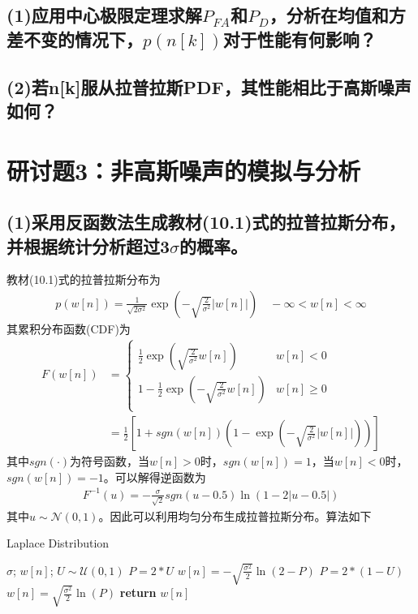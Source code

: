 \documentclass[fontset=windows]{article}
\numberwithin{figure}{section}
\begin{document}
\subsection*{(1)应用中心极限定理求解\(P_{FA}\)和\(P_D\)，分析在均值和方差不变的情况下，\(p(n[k])\)对于性能有何影响？}


\subsection*{(2)若n[k]服从拉普拉斯PDF，其性能相比于高斯噪声如何？}

\newpage
\section{研讨题3：非高斯噪声的模拟与分析}

\subsection*{(1)采用反函数法生成教材(10.1)式的拉普拉斯分布，并根据统计分析超过3\(\sigma\)的概率。}

教材(10.1)式的拉普拉斯分布为
\begin{align*}
    p(w[n])=\frac{1}{\sqrt{2\sigma^2}}\exp\left(-\sqrt{\frac{2}{\sigma^2}}\vert w[n]\vert\right)\quad -\infty<w[n]<\infty
\end{align*}
其累积分布函数(CDF)为
\begin{align*}
    F(w[n]) & =\left\{\begin{matrix}
                          \frac{1}{2}\exp(\sqrt{\frac{2}{\sigma^2}}w[n])    & w[n]<0         \\
                          1-\frac{1}{2}\exp(-\sqrt{\frac{2}{\sigma^2}}w[n]) & w[n]\geqslant0 \\
                      \end{matrix} \right. \\
            & =\frac{1}{2}\left[1+sgn(w[n])(1-\exp\left(-\sqrt{\frac{2}{\sigma^2}}\vert w[n]\vert\right))\right]
\end{align*}
其中\(sgn(\cdot)\)为符号函数，当\(w[n]>0\)时，\(sgn(w[n])=1\)，当\(w[n]<0\)时，\(sgn(w[n])=-1\)。可以解得逆函数为
\begin{align*}
    F^{-1}(u)=-\frac{\sigma}{\sqrt{2}}sgn(u-0.5)\ln(1-2\vert u-0.5\vert)
\end{align*}
其中\(u\sim \mathcal{N}(0,1)\)。因此可以利用均匀分布生成拉普拉斯分布。算法如下

\begin{algorithm}[H]
    \caption{Laplace Distribution}
    \label{Laplace}
    \begin{algorithmic}[1]
        \REQUIRE \(\sigma\);
        \ENSURE \(w[n]\);
        \STATE \(U\sim \mathcal{U}(0,1)\)
        \STATE \(P=2*U\)
        \STATE \(w[n]=-\sqrt{\frac{\sigma^2}{2}}\ln(2-P)\)
        \ELSE
        \STATE \(P=2*(1-U)\)
        \STATE \(w[n]=\sqrt{\frac{\sigma^2}{2}}\ln(P)\)
        \ENDIF
        \STATE \textbf{return} \(w[n]\)
    \end{algorithmic}
\end{algorithm}
\end{document}
